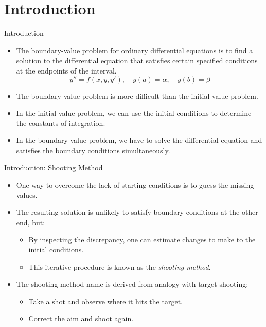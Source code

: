 \documentclass{beamer}
\begin{document}
\section[Introduction]{Introduction}
\begin{frame}{Introduction}
\begin{itemize}
    \item The boundary-value problem for ordinary differential equations is to find a solution 
    to the differential equation that satisfies certain specified conditions at the 
    endpoints of the interval.
    \[
    y'' = f(x, y, y'), \quad y(a) = \alpha, \quad y(b) = \beta
    \]
    \item The boundary-value problem is more difficult than the initial-value problem.
    \item In the initial-value problem, we can use the initial conditions to determine 
    the constants of integration.
    \item In the boundary-value problem, we have to solve the differential equation and satisfies 
    the boundary conditions simultaneously.
\end{itemize}
\end{frame}
\begin{frame}{Introduction: Shooting Method}

    \begin{itemize}
        \item One way to overcome the lack of starting conditions is to guess the missing values.
        \item The resulting solution is unlikely to satisfy boundary conditions at the other end, but:
        \begin{itemize}
            \item By inspecting the discrepancy, one can estimate changes to make to the initial conditions.
            \item This iterative procedure is known as the \textit{shooting method}.
        \end{itemize}
        \item The shooting method name is derived from analogy with target shooting:
        \begin{itemize}
            \item Take a shot and observe where it hits the target.
            \item Correct the aim and shoot again.
        \end{itemize}

    \end{itemize}
\end{frame}
\end{document}
